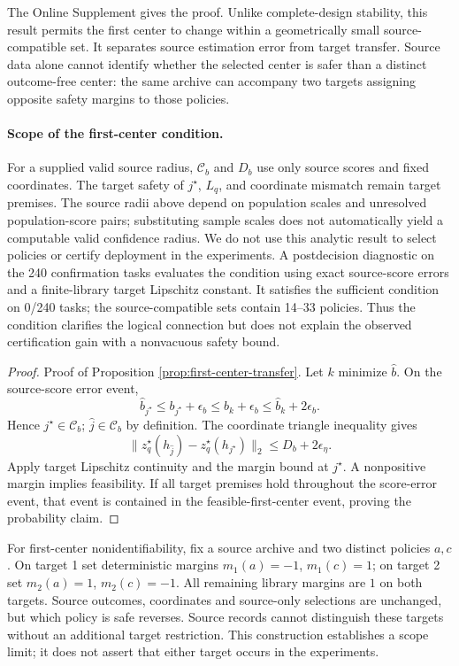 The Online Supplement gives the proof.  Unlike complete-design stability,
this result permits the first center to change within a geometrically small
source-compatible set.  It separates source estimation error from target
transfer.  Source data alone cannot identify whether the selected center is
safer than a distinct outcome-free center: the same archive can accompany
two targets assigning opposite safety margins to those policies.

\paragraph{Scope of the first-center condition.}
For a supplied valid source radius, $\mathcal C_b$ and $D_b$ use only
source scores and fixed coordinates.  The target safety of $j^\star$,
$L_q$, and coordinate mismatch remain target premises.  The source radii
above depend on population scales and unresolved population-score pairs;
substituting sample scales does not automatically yield a computable valid
confidence radius.  We do not use this analytic result to select policies
or certify deployment in the experiments.
A postdecision diagnostic on the 240 confirmation tasks evaluates the
condition using exact source-score errors and a finite-library target
Lipschitz constant.  It satisfies the sufficient condition on 0/240 tasks;
the source-compatible sets contain 14--33 policies.  Thus the condition
clarifies the logical connection but does not explain the observed
certification gain with a nonvacuous safety bound.

\begin{proof}{Proof of Proposition \ref{prop:first-center-transfer}.}
Let $k$ minimize $\widehat b$.  On the source-score error event,
\[
 \widehat b_{j^\star}\le b_{j^\star}+\epsilon_b
 \le b_k+\epsilon_b\le\widehat b_k+2\epsilon_b.
\]
Hence $j^\star\in\mathcal C_b$; $\widehat j\in\mathcal C_b$ by definition.
The coordinate triangle inequality gives
\[
 \|z_q^\star(h_{\widehat j})-z_q^\star(h_{j^\star})\|_2
 \le D_b+2\epsilon_\eta.
\]
Apply target Lipschitz continuity and the margin bound at $j^\star$.
A nonpositive margin implies feasibility.  If all target premises hold
throughout the score-error event, that event is contained in the
feasible-first-center event, proving the probability claim.
\Halmos
\end{proof}

For first-center nonidentifiability, fix a source archive and two distinct
policies $a,c$.  On target 1 set deterministic margins
$m_1(a)=-1$, $m_1(c)=1$; on target 2 set $m_2(a)=1$, $m_2(c)=-1$.
All remaining library margins are $1$ on both targets.  Source outcomes,
coordinates and source-only selections are unchanged, but which policy is
safe reverses.  Source records cannot distinguish these targets without an
additional target restriction.  This construction establishes a scope
limit; it does not assert that either target occurs in the experiments.

